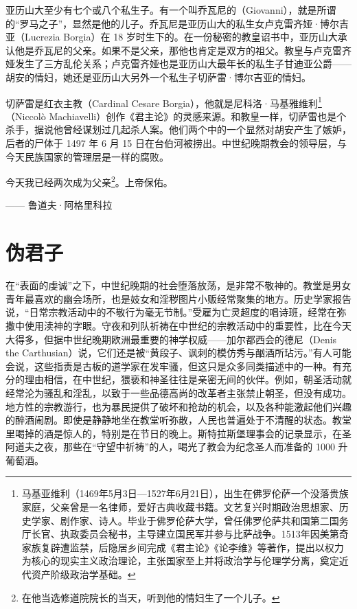 亚历山大至少有七个或八个私生子。有一个叫乔瓦尼的（Giovanni），就是所谓的“罗马之子”，显然是他的儿子。乔瓦尼是亚历山大的私生女卢克雷齐娅·博尔吉亚（Lucrezia Borgia）在 18 岁时生下的。在一份秘密的教皇诏书中，亚历山大承认他是乔瓦尼的父亲。如果不是父亲，那他也肯定是双方的祖父。教皇与卢克雷齐娅发生了三方乱伦关系；卢克雷齐娅也是亚历山大最年长的私生子甘迪亚公爵——胡安的情妇，她还是亚历山大另外一个私生子切萨雷·博尔吉亚的情妇。

切萨雷是红衣主教（Cardinal Cesare Borgia），他就是尼科洛·马基雅维利\footnote{马基亚维利（1469年5月3日—1527年6月21日），出生在佛罗伦萨一个没落贵族家庭，父亲曾是一名律师，爱好古典收藏书籍。文艺复兴时期政治思想家、历史学家、剧作家、诗人。毕业于佛罗伦萨大学，曾任佛罗伦萨共和国第二国务厅长官、执政委员会秘书，主导建立国民军并参与比萨战争。1513年因美第奇家族复辟遭监禁，后隐居乡间完成《君主论》《论李维》等著作，提出以权力为核心的现实主义政治理论，主张国家至上并将政治学与伦理学分离，奠定近代资产阶级政治学基础。}（Niccolò Machiavelli）创作《君主论》的灵感来源。和教皇一样，切萨雷也是个杀手，据说他曾经谋划过几起杀人案。他们两个中的一个显然对胡安产生了嫉妒，后者的尸体于 1497 年 6 月 15 日在台伯河被捞出。中世纪晚期教会的领导层，与今天民族国家的管理层是一样的腐败。

\begin{tcolorbox}
\kaishu 今天我已经两次成为父亲\footnote{在他当选修道院院长的当天，听到他的情妇生了一个儿子。}。上帝保佑。
\begin{flushright}
—— 鲁道夫·阿格里科拉  
\end{flushright} 
\end{tcolorbox}

\section{伪君子}
在“表面的虔诚”之下，中世纪晚期的社会堕落放荡，是非常不敬神的。教堂是男女青年最喜欢的幽会场所，也是妓女和淫秽图片小贩经常聚集的地方。历史学家报告说，“日常宗教活动中的不敬行为毫无节制。”受雇为亡灵超度的唱诗班，经常在弥撒中使用渎神的字眼。守夜和列队祈祷在中世纪的宗教活动中的重要性，比在今天大得多，但据中世纪晚期欧洲最重要的神学权威——加尔都西会的德尼（Denis the Carthusian）说，它们还是被“黄段子、讽刺的模仿秀与酗酒所玷污。”有人可能会说，这些指责是古板的道学家在发牢骚，但这只是众多同类描述中的一种。有充分的理由相信，在中世纪，猥亵和神圣往往是亲密无间的伙伴。例如，朝圣活动就经常沦为骚乱和淫乱，以致于一些品德高尚的改革者主张禁止朝圣，但没有成功。地方性的宗教游行，也为暴民提供了破坏和抢劫的机会，以及各种能激起他们兴趣的醉酒闹剧。即使是静静地坐在教堂听弥散，人民也普遍处于不清醒的状态。教堂里喝掉的酒是惊人的，特别是在节日的晚上。斯特拉斯堡理事会的记录显示，在圣阿道夫之夜，那些在“守望中祈祷”的人，喝光了教会为纪念圣人而准备的 1000 升葡萄酒。

